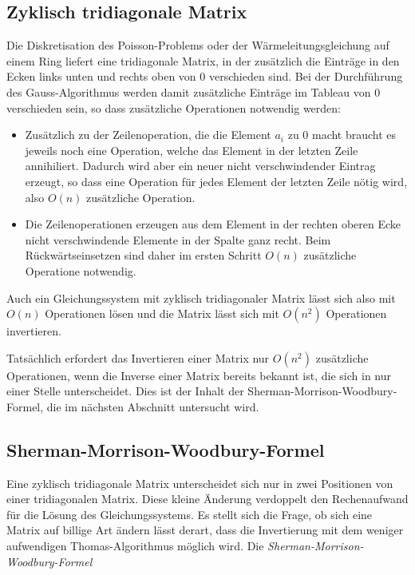 \subsection{Zyklisch tridiagonale Matrix
\label{buch:subsection:zyklischtridiagonal}}
Die Diskretisation des Poisson-Problems oder der Wärmeleitungsgleichung
auf einem Ring liefert eine tridiagonale Matrix, in der zusätzlich die
Einträge in den Ecken links unten und rechts oben von $0$ verschieden sind.
%
%
%
Bei der Durchführung des Gauss-Algorithmus werden damit zusätzliche 
Einträge im Tableau von $0$ verschieden sein, so dass zusätzliche Operationen
notwendig werden:
%
%
\begin{itemize}
\item 
Zusätzlich zu der Zeilenoperation, die die Element 
$a_i$ zu $0$ macht braucht es jeweils noch eine Operation, welche das
Element in der letzten Zeile annihiliert.
%
Dadurch wird aber ein neuer nicht verschwindender Eintrag erzeugt,
so dass eine Operation für jedes Element der letzten Zeile nötig wird,
also $O(n)$ zusätzliche Operation.
\item
Die Zeilenoperationen erzeugen aus dem Element in der rechten oberen
Ecke nicht verschwindende Elemente in der Spalte ganz recht.
Beim Rückwärtseinsetzen sind daher im ersten Schritt $O(n)$ 
zusätzliche Operatione notwendig.
\end{itemize}
Auch ein Gleichungssystem mit zyklisch tridiagonaler Matrix lässt sich also 
mit $O(n)$ Operationen lösen und die Matrix lässt sich mit $O(n^2)$
Operationen invertieren.

Tatsächlich erfordert das Invertieren einer Matrix nur $O(n^2)$
zusätzliche Operationen, wenn die Inverse einer Matrix bereits
bekannt ist, die sich in nur einer Stelle unterscheidet.
Dies ist der Inhalt der Sherman-Morrison-Woodbury-Formel, die
im nächsten Abschnitt untersucht wird.

\subsection{Sherman-Morrison-Woodbury-Formel
\label{buch:subsection:sherman-morrison-woodbury-formel}}
%
Eine zyklisch tridiagonale Matrix unterscheidet sich nur in zwei 
Positionen von einer tridiagonalen Matrix.
Diese kleine Änderung verdoppelt den Rechenaufwand für die Lösung
des Gleichungssystems.
Es stellt sich die Frage, ob sich eine Matrix auf billige Art
ändern lässt derart, dass die Invertierung mit dem weniger
aufwendigen Thomas-Algorithmus möglich wird.
%
Die {\em Sherman-Morrison-Woodbury-Formel} 

